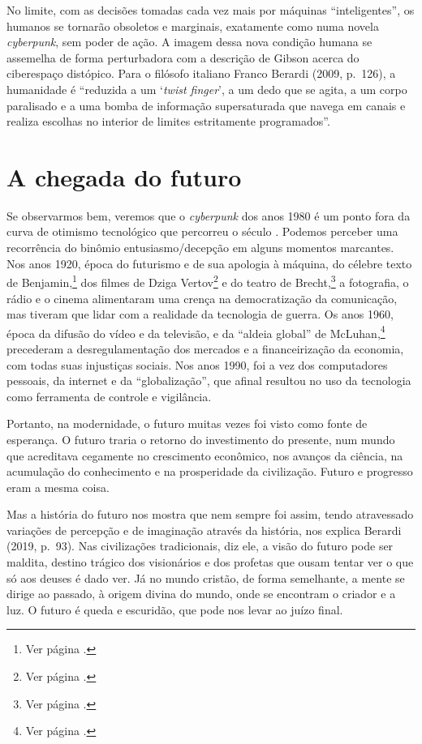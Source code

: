 No limite, com as decisões tomadas cada vez mais por máquinas
``inteligentes'', os humanos se tornarão obsoletos e marginais,
exatamente como numa novela \emph{cyberpunk}, sem poder de ação. A imagem dessa
nova condição humana se assemelha de forma perturbadora com a descrição
de Gibson acerca do ciberespaço distópico. Para o filósofo italiano
Franco Berardi (2009, p.~126), a humanidade é ``reduzida a um `\emph{twist finger}', a um dedo que se agita, a um corpo paralisado e a uma bomba de
informação supersaturada que navega em canais e realiza escolhas no
interior de limites estritamente programados''.

\chapter{A chegada do futuro}

Se observarmos bem, veremos que o \emph{cyberpunk} dos anos 1980 é um ponto fora da curva de otimismo tecnológico que percorreu o século . Podemos perceber uma recorrência do binômio entusiasmo/decepção em alguns momentos marcantes. Nos anos 1920, época do futurismo e de sua apologia à máquina, do célebre texto de Benjamin,\footnote{Ver página \pageref{benjamin}.} dos filmes de Dziga Vertov\footnote{Ver página \pageref{vertov}.} e do teatro de Brecht,\footnote{Ver página \pageref{brecht}.} a fotografia, o rádio e o cinema alimentaram uma crença na democratização da comunicação, mas tiveram que lidar com a realidade da tecnologia de guerra. Os anos 1960, época da difusão do vídeo e da televisão, e da ``aldeia global'' de McLuhan,\footnote{Ver página \pageref{mcluhan}.} precederam a desregulamentação dos mercados e a financeirização da economia, com todas suas injustiças sociais. Nos anos 1990, foi a vez dos computadores pessoais, da internet e da ``globalização'', que afinal resultou no uso da tecnologia como ferramenta de controle e vigilância. 

Portanto, na modernidade, o futuro muitas vezes foi visto como fonte de esperança. O futuro
traria o retorno do investimento do presente, num mundo que acreditava
cegamente no crescimento econômico, nos avanços da ciência, na
acumulação do conhecimento e na prosperidade da civilização. Futuro e
progresso eram a mesma coisa.

Mas a história do futuro nos mostra que nem sempre foi assim, tendo
atravessado variações de percepção e de imaginação através da história,
nos explica Berardi (2019, p.~93). Nas civilizações tradicionais, diz ele, a visão do futuro pode ser maldita, destino trágico dos visionários
e dos profetas que ousam tentar ver o que só aos deuses é dado ver. Já
no mundo cristão, de forma semelhante, a mente se dirige ao passado, à origem divina do
mundo, onde se encontram o criador e a luz. O futuro é queda e escuridão,
que pode nos levar ao juízo final.

